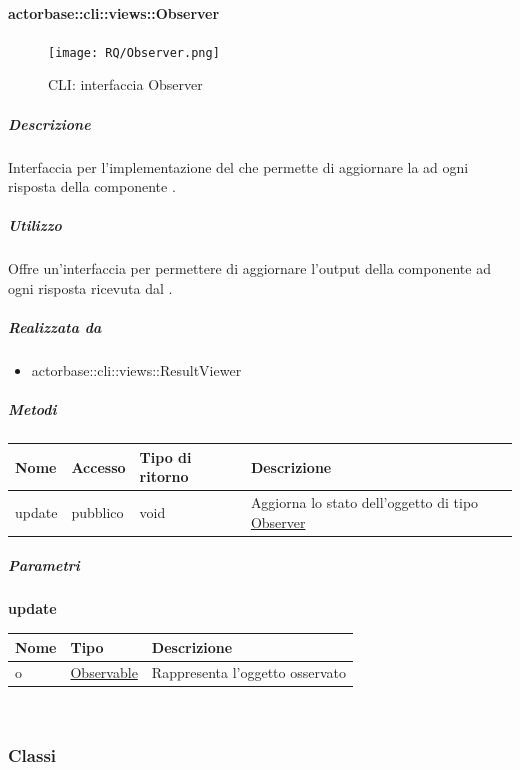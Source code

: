 \documentclass{scalatekids-article}
\begin{document}
\paragraph{actorbase::cli::views::Observer}
\label{sec:actorbase::cli::views::Observer}

\begin{figure}[H]
  \begin{center}
    \texttt{[image: RQ/Observer.png]}
    \caption{CLI: interfaccia Observer}
  \end{center}
\end{figure}

\subparagraph{Descrizione}
Interfaccia per l'implementazione del  
che permette di aggiornare la  ad ogni risposta della componente
.

\subparagraph{Utilizzo}
Offre un'interfaccia per permettere di aggiornare l'output della componente  ad ogni
risposta ricevuta dal .

\subparagraph{Realizzata da}
\begin{itemize}
\item actorbase::cli::views::ResultViewer
\end{itemize}

\subparagraph{Metodi}
\begin{tabular}{| l | l | l | l |}
  \hline
  Nome & Accesso & Tipo di ritorno & Descrizione\\
  \hline
  update & pubblico & void & Aggiorna lo stato dell'oggetto di tipo \hyperref[sec:actorbase::cli::views::Observer]{Observer}\\
  \hline
\end{tabular}

\subparagraph{Parametri}
\begin{center}
  \textbf{update}
\end{center}
\begin{tabular}{| p{3cm} | p{3.5cm} | p{8.5cm} |}
  \hline
  Nome & Tipo & Descrizione\\
  \hline
  o & \hyperref[actorbase::cli::models::Observable]{Observable} & Rappresenta l'oggetto osservato\\
  \hline
\end{tabular}\\

\subsubsection{Classi}
\end{document}
